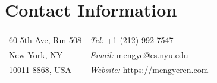 \section{\sc Contact Information}
\vspace{.05in}
\begin{tabular}{@{}p{2in}p{4in}}
60 5th Ave, Rm 508             & {\it Tel:} +1 (212) 992-7547 \\
New York, NY                   & {\it Email:}  \url{mengye@cs.nyu.edu} \\      
10011-8868, USA                & {\it Website:} \url{https://mengyeren.com} \\
\end{tabular}